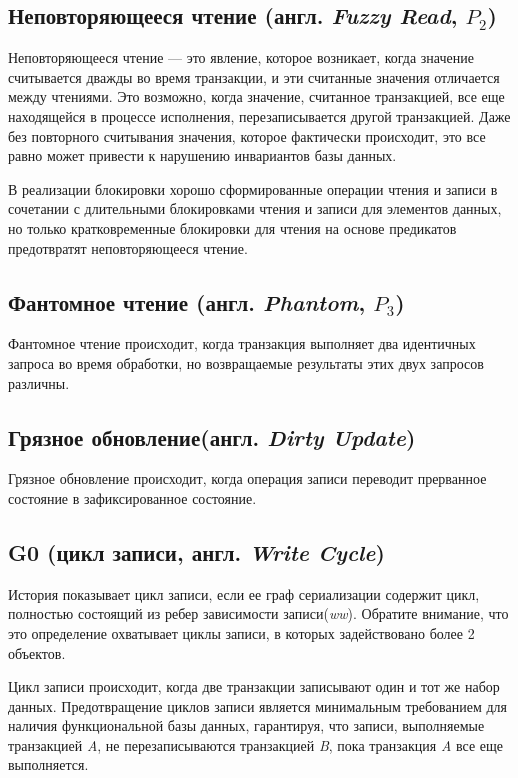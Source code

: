 \documentclass[12pt,  openany]{book}
\begin{document}
\subsection{Неповторяющееся чтение (англ. \textit{Fuzzy Read}, $P_2$)}
Неповторяющееся чтение  --- это явление, которое возникает, когда значение считывается дважды во время транзакции, и эти считанные значения отличается между чтениями.  Это возможно, когда значение, считанное транзакцией, все еще находящейся в процессе исполнения, перезаписывается другой транзакцией. Даже без повторного считывания значения, которое фактически происходит, это все равно может привести к нарушению инвариантов базы данных.  \cite{CritiqueANSI_SQL}

\par В реализации блокировки хорошо сформированные операции чтения и записи в сочетании с длительными блокировками чтения и записи для элементов данных, но только кратковременные блокировки для чтения на основе предикатов предотвратят неповторяющееся чтение. \cite{CritiqueANSI_SQL}

\subsection{Фантомное чтение (англ. \textit{Phantom}, $P_3$)}
Фантомное чтение происходит, когда транзакция выполняет два идентичных запроса во время обработки, но возвращаемые результаты этих двух запросов различны.  \cite{sookocheff}

\subsection{Грязное обновление(англ. \textit{Dirty Update})}
Грязное обновление происходит, когда операция записи переводит прерванное состояние в зафиксированное состояние.

\subsection{G0 (цикл записи, англ. \textit{Write Cycle})}
История показывает цикл записи, если ее граф  сериализации содержит цикл, полностью состоящий из ребер зависимости записи(\textit{ww}). Обратите внимание, что это определение охватывает циклы записи, в которых задействовано более 2 объектов.
\par
Цикл записи происходит, когда две транзакции записывают один и тот же набор данных. Предотвращение циклов записи является минимальным требованием для наличия функциональной базы данных, гарантируя, что записи, выполняемые транзакцией \textit{A}, не перезаписываются транзакцией \textit{B}, пока транзакция \textit{A} все еще выполняется.  \cite{sookocheff}
\end{document}
